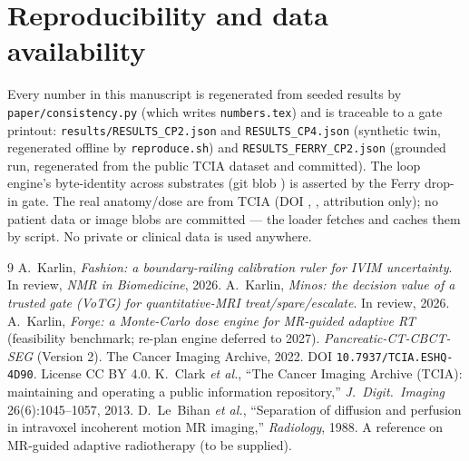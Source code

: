 \documentclass[12pt]{iopart}
\begin{document}
\section*{Reproducibility and data availability}\label{sec:repro}
Every number in this manuscript is regenerated from seeded results by
\texttt{paper/consistency.py} (which writes \texttt{numbers.tex}) and is traceable to a
gate printout: \texttt{results/RESULTS\_CP2.json} and \texttt{RESULTS\_CP4.json}
(synthetic twin, regenerated offline by \texttt{reproduce.sh}) and
\texttt{RESULTS\_FERRY\_CP2.json} (grounded run, regenerated from the public TCIA dataset
and committed). The loop engine's byte-identity across substrates (git blob
\texttt{\numLoopBlob}) is asserted by the Ferry drop-in gate. The real anatomy/dose are
from TCIA \numFerryDataset{} (DOI \texttt{\numFerryDOI}, \numFerryLicense, attribution
only); no patient data or image blobs are committed --- the loader fetches and caches them
by script. No private or clinical data is used anywhere.

\begin{thebibliography}{9}
A.~Karlin, \emph{Fashion: a boundary-railing calibration ruler for IVIM uncertainty}.
In review, \emph{NMR in Biomedicine}, 2026. %
A.~Karlin, \emph{Minos: the decision value of a trusted gate (VoTG) for quantitative-MRI
treat/spare/escalate}. In review, 2026. %
A.~Karlin, \emph{Forge: a Monte-Carlo dose engine for MR-guided adaptive RT} (feasibility
benchmark; re-plan engine deferred to 2027). %
\emph{Pancreatic-CT-CBCT-SEG} (Version 2). The Cancer Imaging Archive, 2022.
DOI \texttt{10.7937/TCIA.ESHQ-4D90}. License CC BY 4.0.
K.~Clark \emph{et al.}, ``The Cancer Imaging Archive (TCIA): maintaining and operating a
public information repository,'' \emph{J.\ Digit.\ Imaging} 26(6):1045--1057, 2013.
D.~Le~Bihan \emph{et al.}, ``Separation of diffusion and perfusion in intravoxel
incoherent motion MR imaging,'' \emph{Radiology}, 1988. %
A reference on MR-guided adaptive radiotherapy (to be supplied).
\end{thebibliography}
\end{document}
